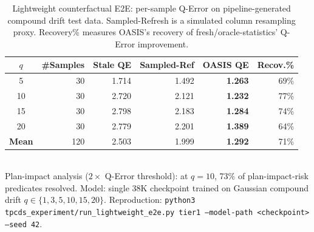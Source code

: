 \begin{table}[t]
  \centering
  \caption{Lightweight counterfactual E2E: per-sample Q-Error on pipeline-generated
  compound drift test data. Sampled-Refresh is a simulated column resampling proxy.
  Recovery\% measures OASIS's recovery of fresh/oracle-statistics' Q-Error improvement.}
  \label{tab:lightweight_e2e}
  \setlength{\tabcolsep}{5pt}
  \begin{tabular}{c r r r r r}
    \toprule
    $q$ & \#Samples & Stale QE & Sampled-Ref & OASIS QE & Recov.\% \\
    \midrule
     5 & 30 & 1.714 & 1.492 & \textbf{1.263} & 69\% \\
    10 & 30 & 2.720 & 2.121 & \textbf{1.232} & 77\% \\
    15 & 30 & 2.798 & 2.183 & \textbf{1.284} & 74\% \\
    20 & 30 & 2.779 & 2.201 & \textbf{1.389} & 64\% \\
    \midrule
    \textbf{Mean} & 120 & 2.503 & 1.999 & \textbf{1.292} & 71\% \\
    \bottomrule
  \end{tabular}
  \\[4pt]
  \small
  Plan-impact analysis ($2\times$ Q-Error threshold): at $q{=}10$, 73\% of
  plan-impact-risk predicates resolved. Model: single 38K checkpoint trained on
  Gaussian compound drift $q{\in}\{1,3,5,10,15,20\}$. Reproduction:
  \texttt{python3 tpcds\_experiment/run\_lightweight\_e2e.py tier1
  --model-path <checkpoint> --seed 42}.
\end{table}
